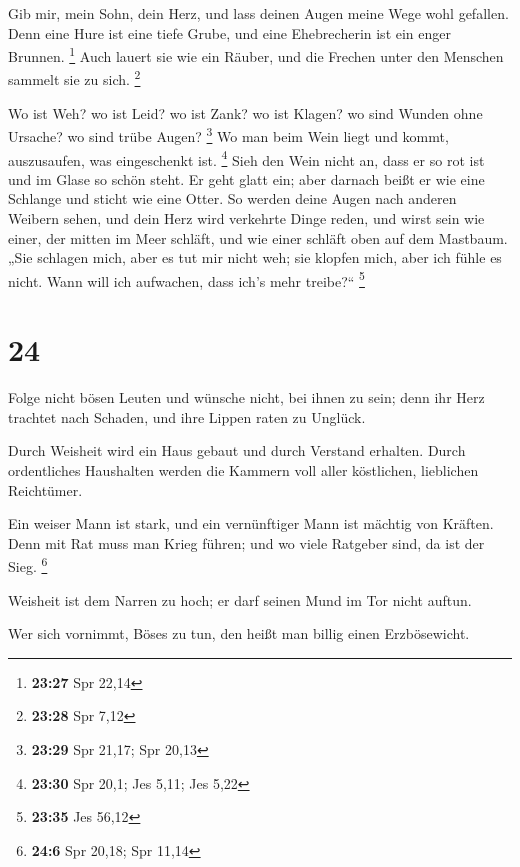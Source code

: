  Gib mir, mein Sohn, dein Herz, und lass deinen Augen
meine Wege wohl gefallen.  Denn eine Hure ist eine tiefe
Grube, und eine Ehebrecherin ist ein enger Brunnen. \footnote{\textbf{23:27}
  Spr 22,14}  Auch lauert sie wie ein Räuber, und die
Frechen unter den Menschen sammelt sie zu sich. \footnote{\textbf{23:28}
  Spr 7,12}

 Wo ist Weh? wo ist Leid? wo ist Zank? wo ist Klagen? wo
sind Wunden ohne Ursache? wo sind trübe Augen? \footnote{\textbf{23:29}
  Spr 21,17; Spr 20,13}  Wo man beim Wein liegt und
kommt, auszusaufen, was eingeschenkt ist. \footnote{\textbf{23:30} Spr
  20,1; Jes 5,11; Jes 5,22}  Sieh den Wein nicht an, dass
er so rot ist und im Glase so schön steht. Er geht glatt ein;
 aber darnach beißt er wie eine Schlange und sticht wie
eine Otter.  So werden deine Augen nach anderen Weibern
sehen, und dein Herz wird verkehrte Dinge reden,  und
wirst sein wie einer, der mitten im Meer schläft, und wie einer schläft
oben auf dem Mastbaum.  „Sie schlagen mich, aber es tut
mir nicht weh; sie klopfen mich, aber ich fühle es nicht. Wann will ich
aufwachen, dass ich's mehr treibe?{}`` \footnote{\textbf{23:35} Jes
  56,12}

\hypertarget{section-23}{%
\section{24}\label{section-23}}

 Folge nicht bösen Leuten und wünsche nicht, bei ihnen zu
sein;  denn ihr Herz trachtet nach Schaden, und ihre
Lippen raten zu Unglück.

 Durch Weisheit wird ein Haus gebaut und durch Verstand
erhalten.  Durch ordentliches Haushalten werden die
Kammern voll aller köstlichen, lieblichen Reichtümer.

 Ein weiser Mann ist stark, und ein vernünftiger Mann ist
mächtig von Kräften.  Denn mit Rat muss man Krieg führen;
und wo viele Ratgeber sind, da ist der Sieg. \footnote{\textbf{24:6} Spr
  20,18; Spr 11,14}

 Weisheit ist dem Narren zu hoch; er darf seinen Mund im
Tor nicht auftun.

 Wer sich vornimmt, Böses zu tun, den heißt man billig
einen Erzbösewicht.

